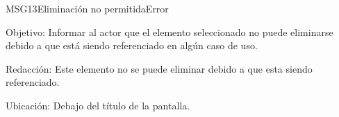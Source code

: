 \begin{mensaje}{MSG13}{Eliminación no permitida}{Error}
	\item [Objetivo:] Informar al actor que el elemento seleccionado no puede eliminarse debido a que está siendo referenciado en algún caso de uso.
	\item[Redacción:] Este elemento no se puede eliminar debido a que esta siendo referenciado.
	\item [Ubicación:] Debajo del título de la pantalla.
\end{mensaje}